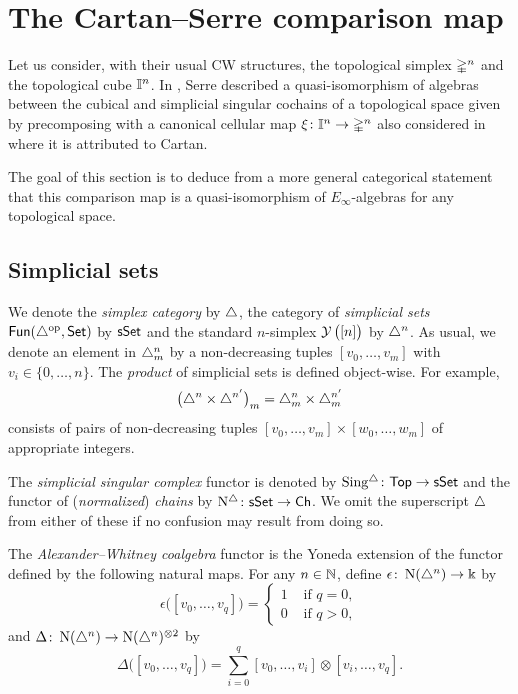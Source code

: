 
\section{The Cartan--Serre comparison map} \label{s:the cartan-serre comparison map}

Let us consider, with their usual CW structures, the topological simplex $\mathbb{\Delta}^n$ and the topological cube $\mathbb{I}^n$.
In \cite[p. 442]{serre1951homologie}, Serre described a quasi-isomorphism of algebras between the cubical and simplicial singular cochains of a topological space given by precomposing with a canonical cellular map $\operatorname{\xi} \colon \mathbb{I}^n \to \mathbb{\Delta}^n$ also considered in \cite[p.199]{eilenberg1953acyclic} where it is attributed to Cartan.

The goal of this section is to deduce from a more general categorical statement that this comparison map is a quasi-isomorphism of $E_\infty$-algebras for any topological space.

\subsection{Simplicial sets} \label{ss:simplicial sets}

We denote the \textit{simplex category} by $\triangle$, the category of \textit{simplicial sets} $\mathsf{Fun}(\triangle^{\mathrm{op}}, \mathsf{Set})$ by $\mathsf{sSet}$ and the standard $n$-simplex $\operatorname{\mathcal{Y}}\big( [n] \big)$ by $\triangle^n$.
As usual, we denote an element in $\triangle^n_m$ by a non-decreasing tuples $[v_0, \dots, v_m]$ with $v_i \in \{0, \dots, n\}$.
The \textit{product} of simplicial sets is defined object-wise.
For example,
\[
\big(\triangle^n \times \triangle^{n^\prime}\big)_m = \triangle^n_m \times \triangle^{n^\prime}_m
\]
consists of pairs of non-decreasing tuples $[v_0, \dots, v_m] \times [w_0, \dots, w_m]$ of appropriate integers.

The \textit{simplicial singular complex} functor is denoted by $\operatorname{Sing^{\triangle}} \colon \mathsf{Top} \to \mathsf{sSet}$ and the functor of (\textit{normalized}) \textit{chains} by $\operatorname{N^{\triangle}} \colon \mathsf{sSet} \to \mathsf{Ch}$.
We omit the superscript $\triangle$ from either of these if no confusion may result from doing so.

The \textit{Alexander--Whitney coalgebra} functor is the Yoneda extension of the functor defined by the following natural maps.
For any $n \in \mathbb{N}$, define $\epsilon \colon \operatorname{N}(\triangle^n) \to \Bbbk$ by
\[
\epsilon \big( [v_0, \dots, v_q] \big) = \begin{cases} 1 & \text{ if } q = 0, \\ 0 & \text{ if } q>0, \end{cases}
\]
and $\Delta \colon \operatorname{N}(\triangle^n) \to \operatorname{N}(\triangle^n)^{\otimes 2}$ by
\[
\Delta \big( [v_0, \dots, v_q] \big) = \sum_{i=0}^q [v_0, \dots, v_i] \otimes [v_i, \dots, v_q].
\]

